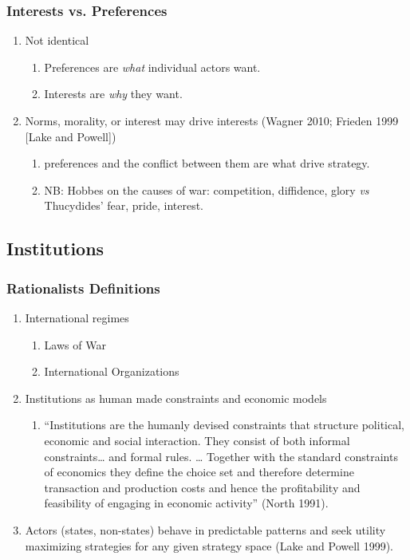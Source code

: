 \documentclass[11pt]{article}
\begin{document}
\subsubsection{Interests vs. Preferences}
\label{sec-1-4-1}
\begin{enumerate}
\item Not identical
\begin{enumerate}
\item Preferences are \emph{what} individual actors want.
\item Interests are \emph{why} they want.
\end{enumerate}
\item Norms, morality, or interest may drive interests (Wagner 2010;
Frieden 1999 [Lake and Powell])
\begin{enumerate}
\item preferences and the conflict between them are what drive strategy.
\item NB: Hobbes on the causes of war: competition, diffidence, glory
\emph{vs} Thucydides' fear, pride, interest.
\end{enumerate}
\end{enumerate}
\subsection{Institutions}
\label{sec-1-5}
\subsubsection{Rationalists Definitions}
\label{sec-1-5-1}
\begin{enumerate}
\item International regimes
\begin{enumerate}
\item Laws of War
\item International Organizations
\end{enumerate}
\item Institutions as human made constraints and economic models
\begin{enumerate}
\item ``Institutions are the humanly devised constraints that structure
political, economic and social interaction. They consist of both
informal constraints\ldots{} and formal rules. \ldots{} Together with the
standard constraints of economics they define the choice set and
therefore determine transaction and production costs and hence
the profitability and feasibility of engaging in economic
activity'' (North 1991).
\end{enumerate}
\item Actors (states, non-states) behave in predictable patterns and seek
utility maximizing strategies for any given strategy space (Lake
and Powell 1999).
\end{enumerate}
\end{document}
